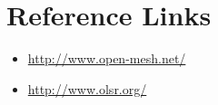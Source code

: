 \section{Reference Links}
\begin{itemize}
\item \url{http://www.open-mesh.net/}
\item \url{http://www.olsr.org/}
\end{itemize}
